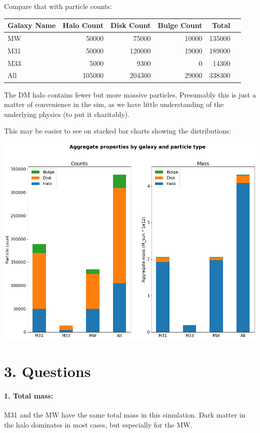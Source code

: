 Compare that with particle counts:\\

\begin{tabular}{lrrrrr}
	\toprule
	\textbf{Galaxy Name} &  \textbf{Halo Count}  &  \textbf{Disk Count} &  \textbf{Bulge Count} &  \textbf{Total} \\
	\midrule
	MW   &   50000 &   75000 &    10000 &  135000 \\
	M31  &   50000 &  120000 &    19000 &  189000 \\
	M33  &    5000 &    9300 &        0 &   14300 \\
	\midrule
	All  &  105000 &  204300 &    29000 &  338300 \\
	\bottomrule
\end{tabular}\vspace{5mm}

The DM halo contains fewer but more massive particles. Presumably this is just a matter of convenience in the sim, as we have little understanding of the underlying physics (to put it charitably).

This may be easier to see on stacked bar charts showing the distributions:

{\centering \includegraphics[scale=0.5]{stackedbar} \par}

\section*{3. Questions}

\paragraph{1. Total mass:} M31 and the MW have the same total mass in this simulation. Dark matter in the halo dominates in most cases, but especially for the MW.

